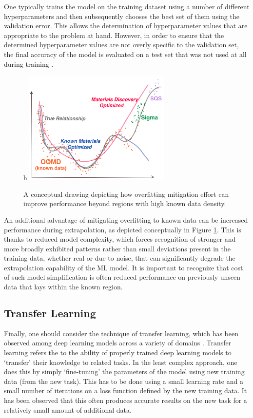 One typically trains the model on the training dataset using a number of different hyperparameters and then subsequently chooses the best set of them using the validation error. This allows the determination of hyperparameter values that are appropriate to the problem at hand. However, in order to ensure that the determined hyperparameter values are not overly specific to the validation set, the final accuracy of the model is evaluated on a test set that was not used at all during training \cite{hastie2009elements}.

\begin{figure}{h}
    \centering
    \includegraphics[width=0.65\textwidth]{sipfenn/Overfitting_discovery.png}
    \caption{A conceptual drawing depicting how overfitting mitigation effort can improve performance beyond regions with high known data density.}
    \label{sipfenn:fig:overfitting_newregions}
\end{figure}

An additional advantage of mitigating overfitting to known data can be increased performance during extrapolation, as depicted conceptually in Figure \ref{sipfenn:fig:overfitting_newregions}. This is thanks to reduced model complexity, which forces recognition of stronger and more broadly exhibited patterns rather than small deviations present in the training data, whether real or due to noise, that can significantly degrade the extrapolation capability of the ML model. It is important to recognize that cost of such model simplification is often reduced performance on previously unseen data that lays within the known region.


\subsection{Transfer Learning} \label{sipfenn:ssec:transferlearning}
Finally, one should consider the technique of transfer learning, which has been observed among deep learning models across a variety of domains \cite{tan2018survey,cirecsan2012transfer,chang2017unsupervised,george2018deep}. Transfer learning refers the to the ability of properly trained deep learning models to `transfer' their knowledge to related tasks. In the least complex approach, one does this by simply `fine-tuning' the parameters of the model using new training data (from the new task). This has to be done using a small learning rate and a small number of iterations on a loss function defined by the new training data. It has been observed that this often produces accurate results on the new task for a relatively small amount of additional data. 

